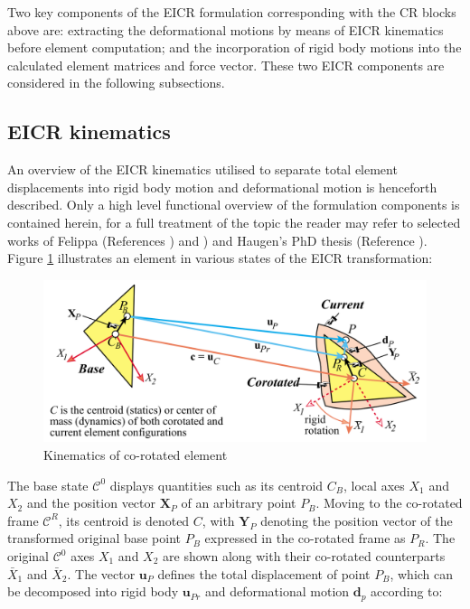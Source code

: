 Two key components of the EICR formulation corresponding with the CR blocks above are: extracting the deformational motions by means of EICR kinematics before element computation; and the incorporation of rigid body motions into the calculated element matrices and force vector. These two EICR components are considered in the following subsections.

\subsection{EICR kinematics}
An overview of the EICR kinematics utilised to separate total element displacements into rigid body motion and deformational motion is henceforth described. Only a high level functional overview of the formulation components is contained herein, for a full treatment of the topic the reader may refer to selected works of Felippa (References \cite{FelippaCR1_2016}) and \cite{felippa2000systematic}) and Haugen's PhD thesis (Reference \cite{Hau94}). Figure \ref{cr4} illustrates an element in various states of the EICR transformation:

\begin{figure}[H]
	\centering
	\def\svgwidth{\columnwidth}
	\includegraphics[width=14cm]{images/cr_4.png}
	\caption{Kinematics of co-rotated element \cite{felippa2000systematic}}
	\label{cr4}
\end{figure}

The base state $\mathscr{C}^0$ displays quantities such as its centroid $C_B$, local axes $X_1$ and $X_2$ and the position vector $\mathbf{X}_P$ of an arbitrary point $P_B$. Moving to the co-rotated frame $\mathscr{C}^R$, its centroid is denoted $C$, with $\mathbf{Y}_P$ denoting the position vector of the transformed original base point $P_B$ expressed in the co-rotated frame as $P_R$. The original $\mathscr{C}^0$ axes $X_1$ and $X_2$ are shown along with their co-rotated counterparts $\bar{X}_1$ and $\bar{X}_2$. The vector $\mathbf{u}_P$ defines the total displacement of point $P_B$, which can be decomposed into rigid body $\mathbf{u}_{Pr}$ and deformational motion $\mathbf{d}_p$ according to:

